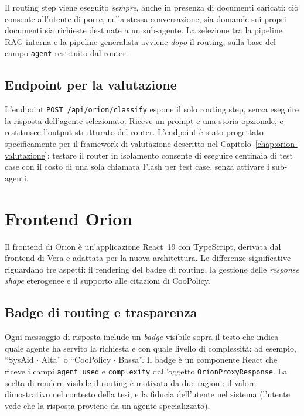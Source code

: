 Il routing step viene eseguito \emph{sempre}, anche in presenza di documenti caricati: 
ciò consente all'utente di porre, nella stessa conversazione, sia domande sui propri documenti sia richieste destinate a un sub-agente. 
La selezione tra la pipeline RAG interna e la pipeline generalista avviene \emph{dopo} il routing, sulla base del campo \texttt{agent} restituito dal router.

\subsection{Endpoint per la valutazione}
\label{subsec:orion-impl-classify}

L'endpoint \texttt{POST /api/orion/classify} espone il solo routing step, senza eseguire la risposta dell'agente selezionato. 
Riceve un prompt e una storia opzionale, e restituisce l'output strutturato del router. 
L'endpoint è stato progettato specificamente per il framework di valutazione descritto nel Capitolo~\ref{chap:orion-valutazione}: 
testare il router in isolamento consente di eseguire centinaia di test case con il costo di una sola chiamata Flash per test case, senza attivare i sub-agenti.

\section{Frontend Orion}
\label{sec:orion-impl-frontend}

Il frontend di Orion è un'applicazione React~19 con TypeScript, derivata dal frontend di Vera e 
adattata per la nuova architettura. Le differenze significative riguardano tre aspetti: 
il rendering del badge di routing, la gestione delle \emph{response shape} eterogenee e il supporto alle citazioni di CooPolicy.

\subsection{Badge di routing e trasparenza}
\label{subsec:orion-impl-fe-routing}

Ogni messaggio di risposta include un \emph{badge} visibile sopra il testo che 
indica quale agente ha servito la richiesta e con quale livello di complessità: 
ad esempio, ``SysAid $\cdot$ Alta'' o ``CooPolicy $\cdot$ Bassa''. 
Il badge è un componente React che riceve i campi \texttt{agent\_used} e \texttt{complexity} 
dall'oggetto \texttt{OrionProxyResponse}. La scelta di rendere visibile il routing è motivata da due ragioni: il valore dimostrativo nel contesto della tesi, 
e la fiducia dell'utente nel sistema (l'utente vede che la risposta proviene da un agente specializzato).

